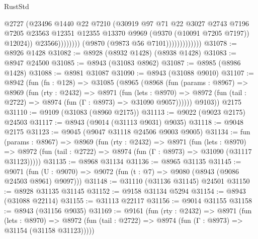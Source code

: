 \begin{lexlean}{RustStd}
\begin{coremodule}
                                          @2727
                                          (@23496
                                            @1440
                                            @22
                                            @7210
                                            (@30919
                                              @97
                                              @71
                                              @22
                                              @3027
                                              @2743
                                              @7196
                                              @7205
                                              @23563
                                              @12351
                                              @12355
                                              @13370
                                              @9969
                                              (@9370 (@10091 @7205 @7197))
                                              @12024))
                                          @23566))))))))
                          (@9870 (@9873 @56 @7101)))))))))))))
@31078 := @8926 @1428
@31082 := @8928 (@8932 @1428) (@8938 @1428)
@31083 := @8947 @24500
@31085 := @8943 (@31083 @8962)
@31087 := @8985 (@8986 @1428)
@31088 := @8981 @31087
@31090 := @8943 (@31088 @9010)
@31107 := @8942
    (fun (fn : @128) =>
    @31085
      (@8965
        (@8968
          (fun (params : @8967) =>
          @8969
            (fun (rty : @2432) =>
            @8971
              (fun (lets : @8970) =>
              @8972 (fun (tail : @2722) => @8974 (fun (Γ : @8973) => @31090 @9057))))))
        @9103))
    @2175
@31110 := @9109 (@31083 (@8960 @2175))
@31113 := @9022 (@9023 @2175) @24503
@31117 := @8943 (@9014 (@31113 @9031) @9035)
@31118 := @9048 @2175
@31123 := @9045 (@9047 @31118 @24506 @9003 @9005)
@31134 := fun (params : @8967) =>
  @8969
    (fun (rty : @2432) =>
    @8971
      (fun (lets : @8970) =>
      @8972 (fun (tail : @2722) => @8974 (fun (Γ : @8973) => @31090 (@31117 @31123)))))
@31135 := @8968 @31134
@31136 := @8965 @31135
@31145 := @9071
    (fun (U : @9070) => @9072 (fun (t : @7) => @9080 (@8943 (@9086 @24503 @8961) @9097)))
@31148 := @31110 (@31136 @31145) @24501
@31150 := @8928 @31135 @31145
@31152 := @9158 @31134 @5294
@31154 := @8943 (@31088 @22114)
@31155 := @31113 @22117
@31156 := @9014 @31155
@31158 := @8943 (@31156 @9035)
@31169 := @9161
    (fun (rty : @2432) =>
    @8971
      (fun (lets : @8970) =>
      @8972 (fun (tail : @2722) => @8974 (fun (Γ : @8973) => @31154 (@31158 @31123)))))

\end{coremodule}
\end{lexlean}
